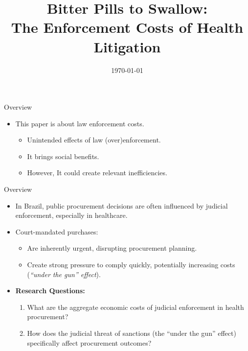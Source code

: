 \documentclass[aspectratio=169]{beamer}
\title[Bitter Pills to Swallow]{\textbf{Bitter Pills to Swallow:\\ The Enforcement Costs of Health Litigation}}
\author{\textbf{Darcio Genicolo-Martins \and Paulo Furquim de Azevedo}}
\institute[]{Insper\\
\href{mailto:d.g.martins@insper.edu.br}{\texttt{darciogm1@insper.edu.br}}}
\date{\today}
\begin{document}
{
\begin{frame}
  \titlepage
\end{frame}
}

\begin{frame}{Overview}
\begin{itemize}
    \item This paper is about law enforcement costs.
    \begin{itemize}
        \item Unintended effects of law (over)enforcement.
        \item It brings social benefits.
        \item However, It could create relevant inefficiencies.
    \end{itemize}
\end{itemize}
\end{frame}

\begin{frame}{Overview}
\begin{itemize}
    \item In Brazil, public procurement decisions are often influenced by judicial enforcement, especially in healthcare.
    \item Court-mandated purchases:
    \begin{itemize}
        \item Are inherently urgent, disrupting procurement planning.
        \item Create strong pressure to comply quickly, potentially increasing costs (\emph{“under the gun” effect}).
    \end{itemize}
    \item \textbf{Research Questions:}
    \begin{enumerate}
        \item What are the aggregate economic costs of judicial enforcement in health procurement?
        \item How does the judicial threat of sanctions (the “under the gun” effect) specifically affect procurement outcomes?
    \end{enumerate}
\end{itemize}
\end{frame}
\end{document}
